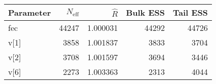 \begin{table}[!h]
\centering
\begin{tabular}{>{\raggedright\arraybackslash}p{2cm}rrrr}
\toprule
Parameter & $N_{\text{eff}}$ & $\widehat{R}$ & Bulk ESS & Tail ESS\\
\midrule
\rowcolor{gray!6}  fec & 44247 & 1.000031 & 44292 & 44726\\
v[1] & 3858 & 1.001837 & 3833 & 3704\\
\rowcolor{gray!6}  v[2] & 3708 & 1.001597 & 3694 & 3446\\
v[6] & 2273 & 1.003363 & 2313 & 4044\\
\bottomrule
\end{tabular}
\end{table}